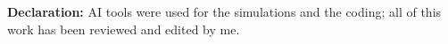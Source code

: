 \documentclass[12pt,a4paper]{article}
\begin{document}

\newpage

\newpage


\par\vspace{0.6cm}
\noindent\begin{minipage}{\linewidth}%
\textbf{Declaration:} AI tools were used for the simulations and the coding; all of this work has been
reviewed and edited by me.
\end{minipage}
\end{document}
